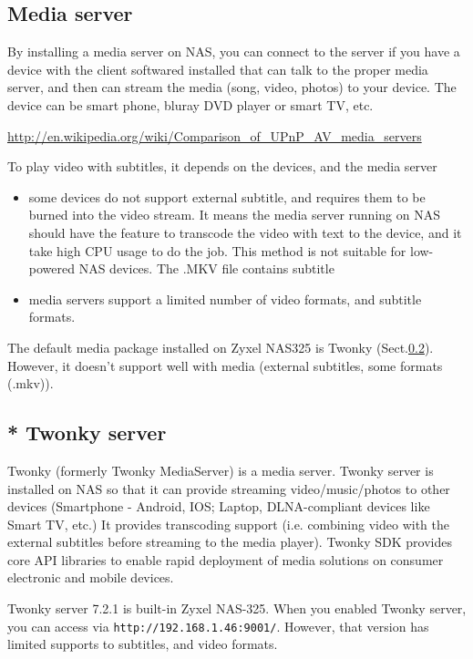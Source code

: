 \subsection{Media server}

By installing a media server on NAS, you can connect to the server if you have a
device with the client softwared installed that can talk to the proper
media server, and then can stream the media (song, video, photos) to your
device. The device can be smart phone, bluray DVD player or smart TV, etc.

\url{http://en.wikipedia.org/wiki/Comparison_of_UPnP_AV_media_servers}

To play video with subtitles, it depends on the devices, and the media server
\begin{itemize}
  \item some devices do not support external subtitle, and requires them to be
  burned into the video stream. It means the media server running on NAS should
  have the feature to transcode the video with text to the device, and it take
  high CPU usage to do the job. This method is not suitable for low-powered NAS
  devices. The .MKV file contains subtitle
  
  \item media servers support a limited number of video formats, and subtitle
  formats.
\end{itemize}

The default media package installed on Zyxel NAS325 is Twonky
(Sect.\ref{sec:twonky}). However, it doesn't support well with media (external
subtitles, some formats (.mkv)). 


\subsection{* Twonky server}
\label{sec:twonky}

Twonky (formerly Twonky MediaServer) is a media server. Twonky
server is installed on NAS so that it can provide streaming video/music/photos
to other devices (Smartphone - Android, IOS; Laptop, DLNA-compliant devices like
Smart TV, etc.) It provides transcoding support (i.e. combining video with the
external subtitles before streaming to the media player). Twonky SDK provides
core API libraries to enable rapid deployment of media solutions on consumer
electronic and mobile devices.  

Twonky server 7.2.1 is built-in Zyxel NAS-325. When you enabled Twonky server,
you can access via \verb!http://192.168.1.46:9001/!. However, that version has limited
supports to subtitles, and video formats.

